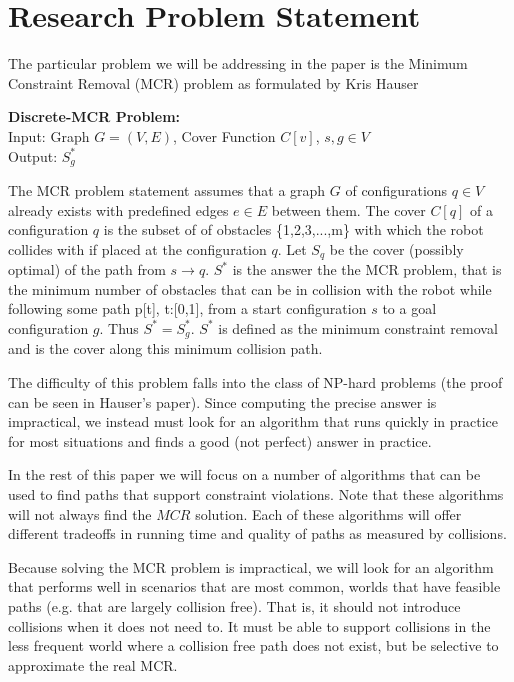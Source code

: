 \section{Research Problem Statement} \label{intro:statement}
The particular problem we will be addressing in the paper is the Minimum Constraint Removal (MCR) problem as formulated by Kris Hauser \cite{hauser:mcr}
\newline

\noindent
{\bf{Discrete-MCR Problem:}}\\
Input: Graph $G = (V,E)$, Cover Function $C[v]$, $s,g \in V$  \\
Output: $S^{*}_g$
\newline

The MCR problem statement assumes that a graph $G$ of configurations $q \in V$ already exists with predefined edges $e \in E$ between them. The cover $C[q]$ of a configuration $q$ is the subset of of obstacles \{1,2,3,...,m\} with which the robot collides with if placed at the configuration $q$. Let $S_q$ be the cover (possibly optimal) of the path from $s \rightarrow q$. $S^{*}$ is the answer the the MCR problem, that is the minimum number of obstacles that can be in collision with the robot while following some path p[t], t:[0,1], from a start configuration $s$ to a goal configuration $g$. Thus $S^{*} = S^{*}_g$. $S^{*}$ is defined as the minimum constraint removal and is the cover along this minimum collision path. 

The difficulty of this problem falls into the class of NP-hard problems (the proof can be seen in Hauser's paper). Since computing the precise answer is impractical, we instead must look for an algorithm that runs quickly in practice for most situations and finds a good (not perfect) answer in practice.

In the rest of this paper we will focus on a number of algorithms that can be used to find paths that support constraint violations. Note that these algorithms will not always find the $MCR$ solution. Each of these algorithms will offer different tradeoffs in running time and quality of paths as measured by collisions.

Because solving the MCR problem is impractical, we will look for an algorithm that performs well in scenarios that are most common, worlds that have feasible paths (e.g. that are largely collision free). That is, it should not introduce collisions when it does not need to. It must be able to support collisions in the less frequent world where a collision free path does not exist, but be selective to approximate the real MCR.
